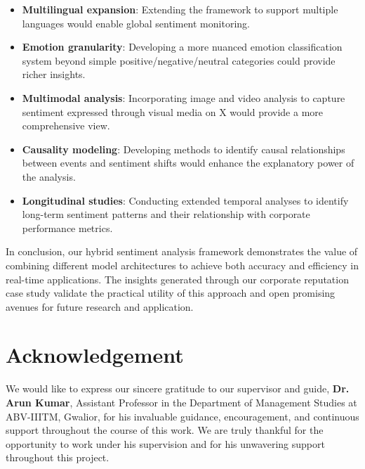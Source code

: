 \documentclass[conference]{IEEEtran}
\begin{document}
\begin{itemize}
    \item \textbf{Multilingual expansion}: Extending the framework to support multiple languages would enable global sentiment monitoring.
    
    \item \textbf{Emotion granularity}: Developing a more nuanced emotion classification system beyond simple positive/negative/neutral categories could provide richer insights.
    
    \item \textbf{Multimodal analysis}: Incorporating image and video analysis to capture sentiment expressed through visual media on X would provide a more comprehensive view.
    
    \item \textbf{Causality modeling}: Developing methods to identify causal relationships between events and sentiment shifts would enhance the explanatory power of the analysis.
    
    \item \textbf{Longitudinal studies}: Conducting extended temporal analyses to identify long-term sentiment patterns and their relationship with corporate performance metrics.
\end{itemize}

In conclusion, our hybrid sentiment analysis framework demonstrates the value of combining different model architectures to achieve both accuracy and efficiency in real-time applications. The insights generated through our corporate reputation case study validate the practical utility of this approach and open promising avenues for future research and application.

\section*{Acknowledgement}

We would like to express our sincere gratitude to our supervisor and guide, \textbf{Dr. Arun Kumar}, Assistant Professor in the Department of Management Studies at ABV-IIITM, Gwalior, for his invaluable guidance, encouragement, and continuous support throughout the course of this work. We are truly thankful for the opportunity to work under his supervision and for his unwavering support throughout this project.
\end{document}
